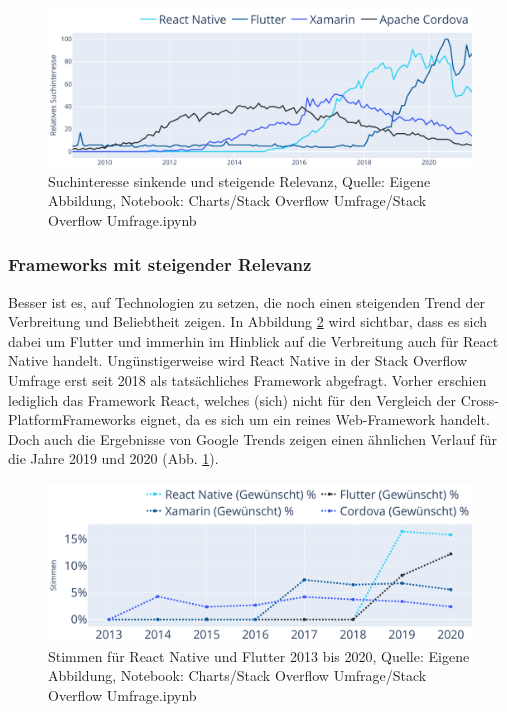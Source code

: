 \begin{figure}[H]
	\centering
    \includegraphics[width=1.0\textwidth]{Charts/Google Trends/Suchinteresse sinkende und steigende Relevanz.pdf}
	\caption[Suchinteresse sinkende und steigende Relevanz]{Suchinteresse sinkende und steigende Relevanz, Quelle: Eigene Abbildung, Notebook: Charts/Stack Overflow Umfrage/Stack Overflow Umfrage.ipynb}
	\label{fig:SuchinteresseSinkendeUndSteigendeRelevanz}
\end{figure}

\subsubsection{Frameworks mit steigender Relevanz}

Besser ist es, auf Technologien zu setzen, die noch einen steigenden Trend der Verbreitung und Beliebtheit zeigen. In Abbildung \ref{fig:ReactNativeUndFlutterStimmen} wird sichtbar, dass es sich dabei um Flutter und immerhin im Hinblick auf die Verbreitung auch für React Native handelt. Ungünstigerweise wird React Native in der Stack Overflow Umfrage erst seit 2018 als tatsächliches Framework abgefragt. Vorher erschien lediglich das Framework React, welches (sich) nicht für den Vergleich der Cross-PlatformFrameworks eignet, da es sich um ein reines Web-Framework handelt. Doch auch die Ergebnisse von Google Trends zeigen einen ähnlichen Verlauf für die Jahre 2019 und 2020 (Abb. \ref{fig:SuchinteresseSinkendeUndSteigendeRelevanz}).

\begin{figure}[H]
	\centering
    \includegraphics[width=1.0\textwidth]{Charts/Stack Overflow Umfrage/React Native und Flutter Stimmen.pdf}
	\caption[Stimmen für React Native und Flutter]{Stimmen für React Native und Flutter 2013 bis 2020, Quelle: Eigene Abbildung, Notebook: Charts/Stack Overflow Umfrage/Stack Overflow Umfrage.ipynb}
	\label{fig:ReactNativeUndFlutterStimmen}
\end{figure}


